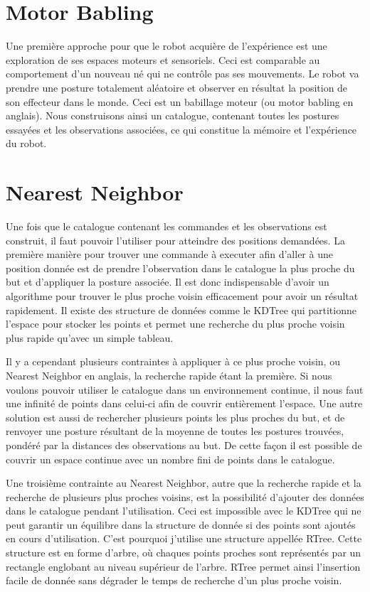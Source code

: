 \documentclass[11pt,french]{report}
\begin{document}
\section{Motor Babling}

Une première approche pour que le robot acquière de l'expérience est une exploration de ses espaces moteurs et sensoriels. Ceci est comparable au comportement d'un nouveau né qui ne contrôle pas ses mouvements. Le robot va prendre une posture totalement aléatoire et observer en résultat la position de son effecteur dans le monde. Ceci est un babillage moteur (ou motor babling en anglais). Nous construisons ainsi un catalogue, contenant toutes les postures essayées et les observations associées, ce qui constitue la mémoire et l'expérience du robot.

\section{Nearest Neighbor}

Une fois que le catalogue contenant les commandes et les observations est construit, il faut pouvoir l'utiliser pour atteindre des positions demandées. La première manière pour trouver une commande à executer afin d'aller à une position donnée est de prendre l'observation dans le catalogue la plus proche du but et d'appliquer la posture associée. Il est donc indispensable d'avoir un algorithme pour trouver le plus proche voisin efficacement pour avoir un résultat rapidement. Il existe des structure de données comme le KDTree qui partitionne l'espace pour stocker les points et permet une recherche du plus proche voisin plus rapide qu'avec un simple tableau. 

Il y a cependant plusieurs contraintes à appliquer à ce plus proche voisin, ou Nearest Neighbor en anglais, la recherche rapide étant la première. Si nous voulons pouvoir utiliser le catalogue dans un environnement continue, il nous faut une infinité de points dans celui-ci afin de couvrir entièrement l'espace. Une autre solution est aussi de rechercher plusieurs points les plus proches du but, et de renvoyer une posture résultant de la moyenne de toutes les postures trouvées, pondéré par la distances des observations au but. De cette façon il est possible de couvrir un espace continue avec un nombre fini de points dans le catalogue.

Une troisième contrainte au Nearest Neighbor, autre que la recherche rapide et la recherche de plusieurs plus proches voisins, est la possibilité d'ajouter des données dans le catalogue pendant l'utilisation. Ceci est impossible avec le KDTree qui ne peut garantir un équilibre dans la structure de donnée si des points sont ajoutés en cours d'utilisation. C'est pourquoi j'utilise une structure appellée RTree. Cette structure est en forme d'arbre, où chaques points proches sont représentés par un rectangle englobant au niveau supérieur de l'arbre. RTree permet ainsi l'insertion facile de donnée sans dégrader le temps de recherche d'un plus proche voisin.
\end{document}
